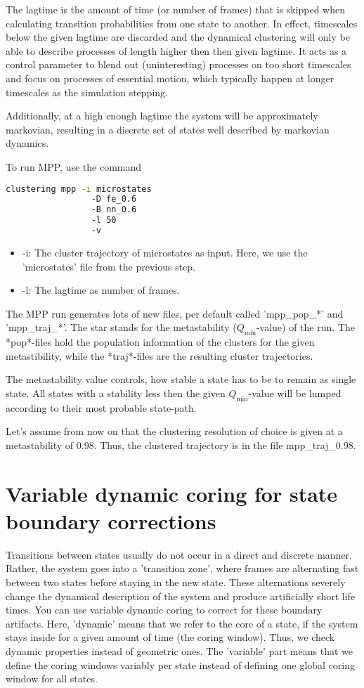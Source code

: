 \documentclass[12pt,a4paper,twoside,english,fleqn]{article}
\begin{document}
The lagtime is the amount of time (or number of frames) that is skipped when calculating transition probabilities
from one state to another.
In effect, timescales below the given lagtime are discarded and the dynamical clustering will only be able to describe
processes of length higher then then given lagtime.
It acts as a control parameter to blend out (uninteresting) processes on too short timescales and focus on
processes of essential motion, which typically happen at longer timescales as the simulation stepping.

Additionally, at a high enough lagtime the system will be approximately markovian, resulting in a discrete set of states
well described by markovian dynamics.

To run MPP, use the command
\begin{lstlisting}[language=bash,basicstyle=\ttfamily]
  clustering mpp -i microstates
                 -D fe_0.6
                 -B nn_0.6
                 -l 50
                 -v
\end{lstlisting}

\begin{itemize}
  \item -i: The cluster trajectory of microstates as input. Here, we use the 'microstates' file from the previous step.
  \item -l: The lagtime as number of frames.
\end{itemize}

The MPP run generates lots of new files, per default called 'mpp\_pop\_*' and 'mpp\_traj\_*'.
The star stands for the metastability ($Q_\text{min}$-value) of the run.
The *pop*-files hold the population information of the clusters for the given metastibility,
while the *traj*-files are the resulting cluster trajectories.

The metastability value controls, how stable a state has to be to remain as single state.
All states with a stability less then the given $Q_\text{min}$-value will be lumped according
to their most probable state-path.

Let's assume from now on that the clustering resolution of choice is given at a metastability of 0.98.
Thus, the clustered trajectory is in the file mpp\_traj\_0.98.


\section{Variable dynamic coring for state boundary corrections}
Transitions between states usually do not occur in a direct and discrete manner.
Rather, the system goes into a 'transition zone', where frames are alternating fast between
two states before staying in the new state.
These alternations severely change the dynamical description of the system and produce artificially
short life times.
You can use variable dynamic coring to correct for these boundary artifacts.
Here, 'dynamic' means that we refer to the core of a state, if the system stays inside for
a given amount of time (the coring window). Thus, we check dynamic properties instead of geometric ones.
The 'variable' part means that we define the coring windows variably per state instead
of defining one global coring window for all states.
\end{document}

